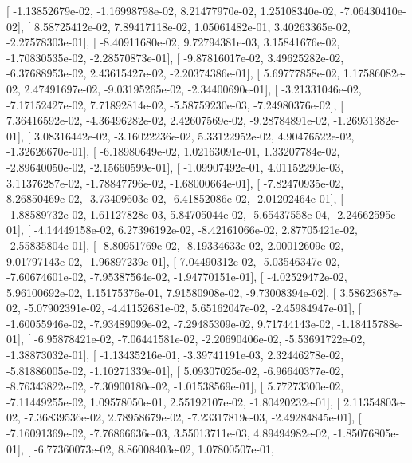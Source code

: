 \documentclass{article}
\begin{document}
       [ -1.13852679e-02,  -1.16998798e-02,   8.21477970e-02,
          1.25108340e-02,  -7.06430410e-02],
       [  8.58725412e-02,   7.89417118e-02,   1.05061482e-01,
          3.40263365e-02,  -2.27578303e-01],
       [ -8.40911680e-02,   9.72794381e-03,   3.15841676e-02,
         -1.70830535e-02,  -2.28570873e-01],
       [ -9.87816017e-02,   3.49625282e-02,  -6.37688953e-02,
          2.43615427e-02,  -2.20374386e-01],
       [  5.69777858e-02,   1.17586082e-02,   2.47491697e-02,
         -9.03195265e-02,  -2.34400690e-01],
       [ -3.21331046e-02,  -7.17152427e-02,   7.71892814e-02,
         -5.58759230e-03,  -7.24980376e-02],
       [  7.36416592e-02,  -4.36496282e-02,   2.42607569e-02,
         -9.28784891e-02,  -1.26931382e-01],
       [  3.08316442e-02,  -3.16022236e-02,   5.33122952e-02,
          4.90476522e-02,  -1.32626670e-01],
       [ -6.18980649e-02,   1.02163091e-01,   1.33207784e-02,
         -2.89640050e-02,  -2.15660599e-01],
       [ -1.09907492e-01,   4.01152290e-03,   3.11376287e-02,
         -1.78847796e-02,  -1.68000664e-01],
       [ -7.82470935e-02,   8.26850469e-02,  -3.73409603e-02,
         -6.41852086e-02,  -2.01202464e-01],
       [ -1.88589732e-02,   1.61127828e-03,   5.84705044e-02,
         -5.65437558e-04,  -2.24662595e-01],
       [ -4.14449158e-02,   6.27396192e-02,  -8.42161066e-02,
          2.87705421e-02,  -2.55835804e-01],
       [ -8.80951769e-02,  -8.19334633e-02,   2.00012609e-02,
          9.01797143e-02,  -1.96897239e-01],
       [  7.04490312e-02,  -5.03546347e-02,  -7.60674601e-02,
         -7.95387564e-02,  -1.94770151e-01],
       [ -4.02529472e-02,   5.96100692e-02,   1.15175376e-01,
          7.91580908e-02,  -9.73008394e-02],
       [  3.58623687e-02,  -5.07902391e-02,  -4.41152681e-02,
          5.65162047e-02,  -2.45984947e-01],
       [ -1.60055946e-02,  -7.93489099e-02,  -7.29485309e-02,
          9.71744143e-02,  -1.18415788e-01],
       [ -6.95878421e-02,  -7.06441581e-02,  -2.20690406e-02,
         -5.53691722e-02,  -1.38873032e-01],
       [ -1.13435216e-01,  -3.39741191e-03,   2.32446278e-02,
         -5.81886005e-02,  -1.10271339e-01],
       [  5.09307025e-02,  -6.96640377e-02,  -8.76343822e-02,
         -7.30900180e-02,  -1.01538569e-01],
       [  5.77273300e-02,  -7.11449255e-02,   1.09578050e-01,
          2.55192107e-02,  -1.80420232e-01],
       [  2.11354803e-02,  -7.36839536e-02,   2.78958679e-02,
         -7.23317819e-03,  -2.49284845e-01],
       [ -7.16091369e-02,  -7.76866636e-03,   3.55013711e-03,
          4.89494982e-02,  -1.85076805e-01],
       [ -6.77360073e-02,   8.86008403e-02,   1.07800507e-01,
\end{document}
